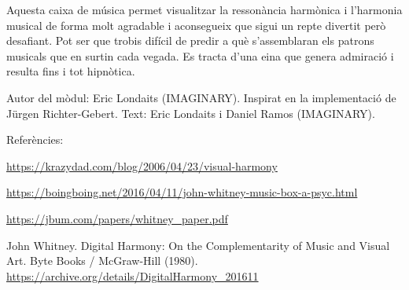 Aquesta caixa de música permet visualitzar la ressonància harmònica i l'harmonia musical de forma molt agradable i aconsegueix que sigui un repte divertit però desafiant. Pot ser que trobis difícil de predir a què s'assemblaran els patrons musicals que en surtin cada vegada. Es tracta d'una eina que genera admiració i resulta fins i tot hipnòtica.


\vfill

Autor del mòdul: Eric Londaits (IMAGINARY). 
Inspirat en la implementació de Jürgen Richter-Gebert.
Text: Eric Londaits i Daniel Ramos (IMAGINARY).

Referències:

\url{https://krazydad.com/blog/2006/04/23/visual-harmony}

\url{https://boingboing.net/2016/04/11/john-whitney-music-box-a-psyc.html}

\url{https://jbum.com/papers/whitney_paper.pdf}

John Whitney. Digital Harmony: On the Complementarity of Music and Visual Art. Byte Books / McGraw-Hill (1980). \url{https://archive.org/details/DigitalHarmony_201611}

